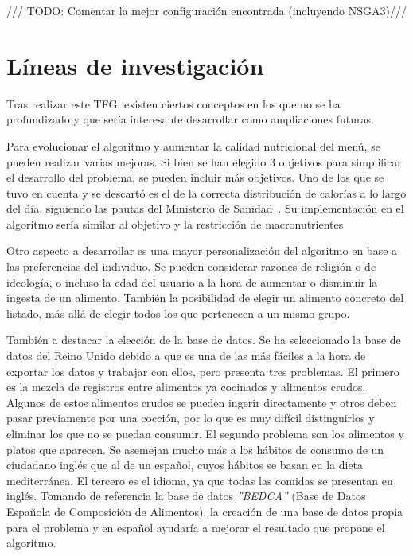 \begin{center}
    {\color{red} \Large /// TODO: Comentar la mejor configuración encontrada (incluyendo NSGA3)///}
\end{center}


\section{Líneas de investigación}
\label{ch:investigacion}

Tras realizar este TFG, existen ciertos conceptos en los que no se ha profundizado y que sería interesante desarrollar como ampliaciones futuras.

Para evolucionar el algoritmo y aumentar la calidad nutricional del menú, se pueden realizar varias mejoras. Si bien se han elegido 3 objetivos para simplificar el desarrollo del problema, se pueden incluir más objetivos. Uno de los que se tuvo en cuenta y se descartó es el de la correcta distribución de calorías a lo largo del día, siguiendo las pautas del Ministerio de Sanidad~\cite{alimentacion_saludable}. Su implementación en el algoritmo sería similar al objetivo y la restricción de macronutrientes

Otro aspecto a desarrollar es una mayor personalización del algoritmo en base a las preferencias del individuo. Se pueden considerar razones de religión o de ideología, o incluso la edad del usuario a la hora de aumentar o disminuir la ingesta de un alimento. También la posibilidad de elegir un alimento concreto del listado, más allá de elegir todos los que pertenecen a un mismo grupo.

También a destacar la elección de la base de datos. Se ha seleccionado la base de datos del Reino Unido debido a que es una de las más fáciles a la hora de exportar los datos y trabajar con ellos, pero presenta tres problemas. El primero es la mezcla de registros entre alimentos ya cocinados y alimentos crudos. Algunos de estos alimentos crudos se pueden ingerir directamente y otros deben pasar previamente por una cocción, por lo que es muy difícil distinguirlos y eliminar los que no se puedan consumir. El segundo problema son los alimentos y platos que aparecen. Se asemejan mucho más a los hábitos de consumo de un ciudadano inglés que al de un español, cuyos hábitos se basan en la dieta mediterránea. El tercero es el idioma, ya que todas las comidas se presentan en inglés. Tomando de referencia la base de datos \textit{''BEDCA''} (Base de Datos Española de Composición de Alimentos), la creación de una base de datos propia para el problema y en español ayudaría a mejorar el resultado que propone el algoritmo.
\newpage

